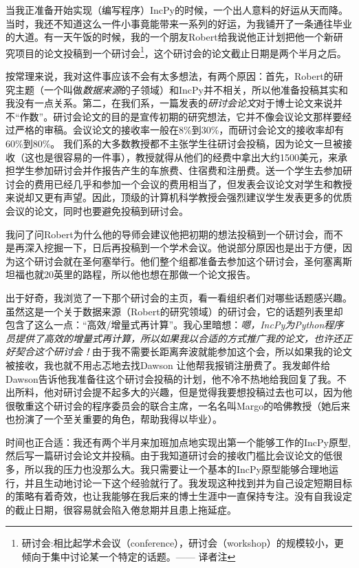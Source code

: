 \documentclass[letter,12pt]{book}
\begin{document}
\begin{CJK}{UTF8}{gbsn}
当我正准备开始实现（编写程序）IncPy的时候，一个出人意料的好运从天而降。当时，我还不知道这么一件小事竟能带来一系列的好运，为我铺开了一条通往毕业的大道。有一天午饭的时候，我的一个朋友Robert给我说他正计划把他一个新研究项目的论文投稿到一个研讨会\footnote{研讨会:相比起学术会议（conference），研讨会（workshop）的规模较小，更倾向于集中讨论某一个特定的话题。—— 译者注}，这个研讨会的论文截止日期是两个半月之后。

按常理来说，我对这件事应该不会有太多想法，有两个原因：首先，Robert的研究主题（一个叫做\emph{数据来源}的子领域）和IncPy并不相关，所以他准备投稿其实和我没有一点关系。第二，在我们系，一篇发表的\emph{研讨会论文}对于博士论文来说并不“作数”。研讨会论文的目的是宣传初期的研究想法，它并不像会议论文那样要经过严格的审稿。会议论文的接收率一般在8\%到30\%，而研讨会论文的接收率却有60\%到80\%。 我们系的大多数教授都不主张学生往研讨会投稿，因为论文一旦被接收（这也是很容易的一件事），教授就得从他们的经费中拿出大约1500美元，来承担学生参加研讨会并作报告产生的车旅费、住宿费和注册费。送一个学生去参加研讨会的费用已经几乎和参加一个会议的费用相当了，但发表会议论文对学生和教授来说却又更有声望。因此，顶级的计算机科学教授会强烈建议学生发表更多的优质会议的论文，同时也要避免投稿到研讨会。

我问了问Robert为什么他的导师会建议他把初期的想法投稿到一个研讨会，而不是再深入挖掘一下，日后再投稿到一个学术会议。他说部分原因也是出于方便，因为这个研讨会就在圣何塞举行。他们整个组都准备去参加这个研讨会，圣何塞离斯坦福也就20英里的路程，所以他也想在那做一个论文报告。

出于好奇，我浏览了一下那个研讨会的主页，看一看组织者们对哪些话题感兴趣。虽然这是一个关于数据来源（Robert的研究领域）的研讨会，它的话题列表里却包含了这么一点：“高效/增量式再计算”。我心里暗想：\emph{嗯，IncPy为Python程序员提供了高效的增量式再计算，所以如果我以合适的方式推广我的论文，也许还正好契合这个研讨会！}由于我不需要长距离奔波就能参加这个会，所以如果我的论文被接收，我也就不用忐忑地去找Dawson 让他帮我报销注册费了。我发邮件给Dawson告诉他我准备往这个研讨会投稿的计划，他不冷不热地给我回复了我。不出所料，他对研讨会提不起多大的兴趣，但是觉得我要想投稿过去也可以，因为他很敬重这个研讨会的程序委员会的联合主席，一名名叫Margo的哈佛教授（她后来也扮演了一个至关重要的角色，帮助我得以毕业）。

时间也正合适：我还有两个半月来加班加点地实现出第一个能够工作的IncPy原型,然后写一篇研讨会论文并投稿。由于我知道研讨会的接收门槛比会议论文的低很多，所以我的压力也没那么大。我只需要让一个基本的IncPy原型能够合理地运行，并且生动地讨论一下这个经验就行了。我发现这种找到并为自己设定短期目标的策略有着奇效，也让我能够在我后来的博士生涯中一直保持专注。没有自我设定的截止日期，很容易就会陷入倦怠期并且患上拖延症。


\end{CJK}
\end{document}
